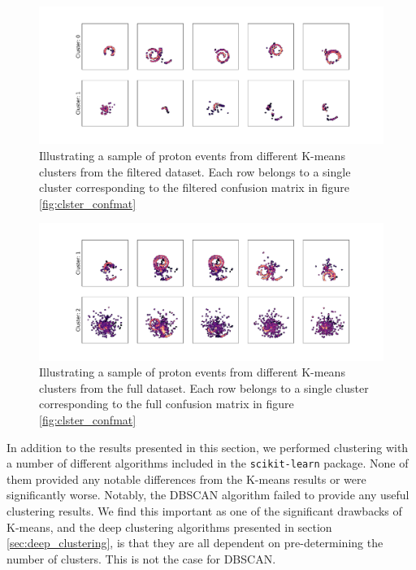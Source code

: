 \documentclass[preprint,12pt]{elsarticle}
\begin{document}
\begin{figure}
\includegraphics[width=\textwidth]{plots/filtered_vgg_cluster_repr.pdf}
\caption[Filtered proton samples by cluster belonging]{Illustrating a sample of proton events from different K-means clusters from the filtered dataset. Each row belongs to a single cluster corresponding to the filtered confusion matrix in figure \ref{fig:clster_confmat}}\label{fig:filtered_vgg_clster_repr}
\end{figure} 

\begin{figure}
\includegraphics[width=\textwidth]{plots/full_vgg_cluster_repr.pdf}
\caption[Full proton samples by cluster belonging]{Illustrating a sample of proton events from different K-means clusters from the full dataset. Each row belongs to a single cluster corresponding to the full confusion matrix in figure \ref{fig:clster_confmat}}\label{fig:full_vgg_clster_repr}
\end{figure} 

In addition to the results presented in this section, we performed clustering with a number of different algorithms included in the \lstinline{scikit-learn} package. None of them provided any notable differences from the K-means results or were significantly worse. Notably, the DBSCAN algorithm failed to provide any useful clustering results. We find this important as one of the significant drawbacks of K-means, and the deep clustering algorithms presented in section \ref{sec:deep_clustering}, is that they are all dependent on pre-determining the number of clusters. This is not the case for DBSCAN. 
\end{document}
